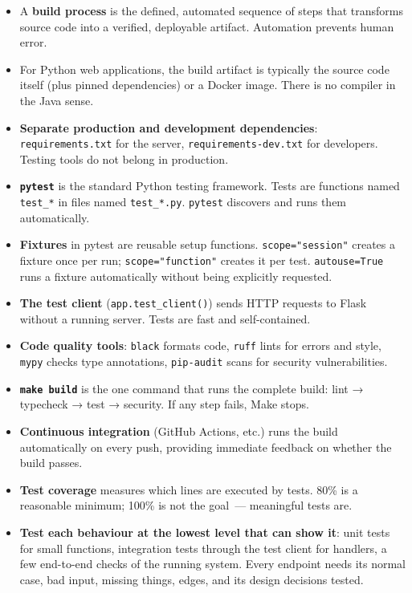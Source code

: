 \label{17-build-process:key-takeaways}
\begin{takeaways}

\begin{itemize}
\tightlist
\item
  A \textbf{build process} is the defined, automated sequence of steps that transforms source code into a verified, deployable artifact. Automation prevents human error.
\item
  For Python web applications, the build artifact is typically the source code itself (plus pinned dependencies) or a Docker image. There is no compiler in the Java sense.
\item
  \textbf{Separate production and development dependencies}: \texttt{requirements.txt} for the server, \texttt{requirements-dev.txt} for developers. Testing tools do not belong in production.
\item
  \textbf{\texttt{pytest}} is the standard Python testing framework. Tests are functions named \texttt{test\_*} in files named \texttt{test\_*.py}. \texttt{pytest} discovers and runs them automatically.
\item
  \textbf{Fixtures} in pytest are reusable setup functions. \texttt{scope="session"} creates a fixture once per run; \texttt{scope="function"} creates it per test. \texttt{autouse=True} runs a fixture automatically without being explicitly requested.
\item
  \textbf{The test client} (\texttt{app.test\_client()}) sends HTTP requests to Flask without a running server. Tests are fast and self-contained.
\item
  \textbf{Code quality tools}: \texttt{black} formats code, \texttt{ruff} lints for errors and style, \texttt{mypy} checks type annotations, \texttt{pip-audit} scans for security vulnerabilities.
\item
  \textbf{\texttt{make\ build}} is the one command that runs the complete build: lint → typecheck → test → security. If any step fails, Make stops.
\item
  \textbf{Continuous integration} (GitHub Actions, etc.) runs the build automatically on every push, providing immediate feedback on whether the build passes.
\item
  \textbf{Test coverage} measures which lines are executed by tests. 80\% is a reasonable minimum; 100\% is not the goal~--- meaningful tests are.
\item
  \textbf{Test each behaviour at the lowest level that can show it}: unit tests for small functions, integration tests through the test client for handlers, a few end-to-end checks of the running system. Every endpoint needs its normal case, bad input, missing things, edges, and its design decisions tested.

\end{itemize}
\end{takeaways}
